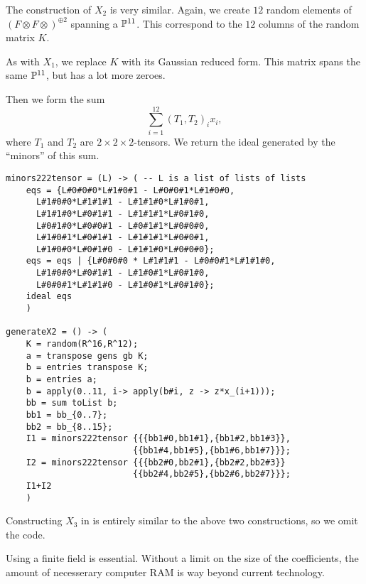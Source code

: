 The construction of $X_2$ is very similar. Again, we create $12$ random elements of $\left(F \otimes F \otimes \right)^{\oplus 2}$ spanning a $\P^{11}$. This correspond to the $12$ columns of the random matrix $K$.

As with $X_1$, we replace $K$ with its Gaussian reduced form. This matrix spans the same $\P^{11}$, but has a lot more zeroes.

Then we form the sum
\[
\sum_{i=1}^{12} (T_1,T_2)_i x_i,
\]
where $T_1$ and $T_2$ are $2 \times 2 \times 2$-tensors. We return the ideal generated by the ``minors'' of this sum.

\begin{lstlisting}[caption=Code for $X_2$, language=Macaulay2]
minors222tensor = (L) -> ( -- L is a list of lists of lists
    eqs = {L#0#0#0*L#1#0#1 - L#0#0#1*L#1#0#0,
      L#1#0#0*L#1#1#1 - L#1#1#0*L#1#0#1,
      L#1#1#0*L#0#1#1 - L#1#1#1*L#0#1#0,
      L#0#1#0*L#0#0#1 - L#0#1#1*L#0#0#0,
      L#1#0#1*L#0#1#1 - L#1#1#1*L#0#0#1,
      L#1#0#0*L#0#1#0 - L#1#1#0*L#0#0#0};
    eqs = eqs | {L#0#0#0 * L#1#1#1 - L#0#0#1*L#1#1#0,
      L#1#0#0*L#0#1#1 - L#1#0#1*L#0#1#0,
      L#0#0#1*L#1#1#0 - L#1#0#1*L#0#1#0};
    ideal eqs
    )

generateX2 = () -> (
    K = random(R^16,R^12);
    a = transpose gens gb K;
    b = entries transpose K;
    b = entries a;
    b = apply(0..11, i-> apply(b#i, z -> z*x_(i+1)));
    bb = sum toList b;
    bb1 = bb_{0..7};
    bb2 = bb_{8..15};
    I1 = minors222tensor {{{bb1#0,bb1#1},{bb1#2,bb1#3}},
                         {{bb1#4,bb1#5},{bb1#6,bb1#7}}};
    I2 = minors222tensor {{{bb2#0,bb2#1},{bb2#2,bb2#3}}
                         {{bb2#4,bb2#5},{bb2#6,bb2#7}}};
    I1+I2
    )
\end{lstlisting}

Constructing $X_3$ in \MM is entirely similar to the above two constructions, so we omit the code.

\begin{remark}
Using a finite field is essential. Without a limit on the size of the coefficients, the amount of necesserary computer RAM is way beyond current technology.
\end{remark}